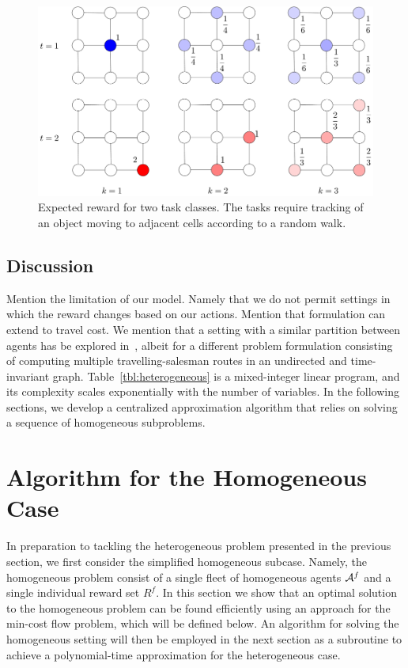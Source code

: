 \documentclass[conference]{IEEEtran}
\newcommand{\todo}[1]{{\color{red}{\bf TODO:} #1}}
\newcommand{\todo}[1]{}
\begin{document}
\begin{figure}[h]
\centering
\includegraphics[width=.35\textwidth]{fig/distribution_and_reward.pdf}
\caption{Expected reward for two task classes. The tasks require tracking of an object moving to adjacent cells according to a random walk.}
\label{fig:distribution_and_reward}
\end{figure}

\subsection{Discussion}
\todo{Mention the limitation of our model. Namely that we do not permit settings in which the reward changes based on our actions. }
\todo{Mention that formulation can extend to travel cost.}
We mention that a setting with a similar partition between agents has be explored in~\cite{PrasadETAL18}, albeit for a different problem formulation consisting of computing multiple travelling-salesman routes in an undirected and time-invariant graph. Table~\ref{tbl:heterogeneous} is a mixed-integer linear program, and its complexity scales exponentially with the number of variables. %
In the following sections, we develop a centralized approximation algorithm that relies on solving a sequence of homogeneous subproblems. %

\section{Algorithm for the Homogeneous Case}
In preparation to tackling the heterogeneous problem presented in the previous section, we first consider the simplified homogeneous subcase. Namely, the homogeneous problem consist of a single fleet of homogeneous agents $\mathcal{A}^f$ and a single individual reward set $R^f$. In this section we show that an optimal solution to the homogeneous problem can be found efficiently using an approach for the min-cost flow problem, which will be defined below. An algorithm for solving the homogeneous setting will then be employed in the next section as a subroutine to achieve a polynomial-time approximation for the heterogeneous case.
\end{document}
